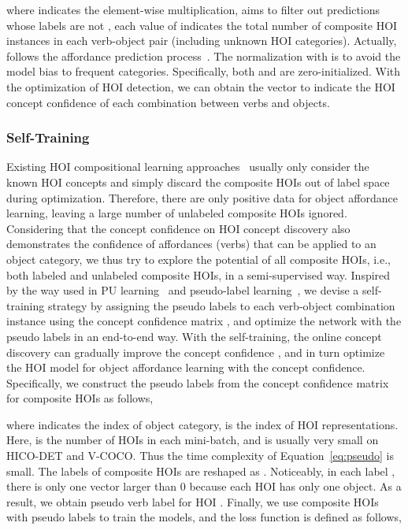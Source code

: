 \documentclass[runningheads]{llncs}
\begin{document}
where  indicates the element-wise multiplication,  aims to filter out predictions whose labels are not , each value of  indicates the total number of composite HOI instances in each verb-object pair (including unknown HOI categories). Actually,  follows the affordance prediction process~\cite{hou2021atl}. The normalization with  is to avoid the model bias to frequent categories. Specifically, both  and  are zero-initialized. With the optimization of HOI detection, we can obtain the vector  to indicate the HOI concept confidence of each combination between verbs and objects.

















\subsubsection{Self-Training}

Existing HOI compositional learning approaches~\cite{hou2020visual,hou2021fcl,hou2021atl} usually only consider the known HOI concepts and simply discard the composite HOIs out of label space during optimization. Therefore, there are only positive data for object affordance learning, leaving a large number of unlabeled composite HOIs ignored. Considering that the concept confidence on HOI concept discovery also demonstrates the confidence of affordances (verbs) that can be applied to an object category, we thus try to explore the potential of all composite HOIs, i.e., both labeled and unlabeled composite HOIs,  in a semi-supervised way. Inspired by the way used in PU learning~\cite{de1999positive} and pseudo-label learning~\cite{lee2013pseudo}, we devise a self-training strategy by assigning the pseudo labels to each verb-object combination instance using the concept confidence matrix , and optimize the network with the pseudo labels in an end-to-end way. With the self-training, the online concept discovery can gradually improve the concept confidence , and in turn optimize the HOI model for object affordance learning with the concept confidence.
Specifically, we construct the pseudo labels  from the concept confidence matrix  for composite HOIs  as follows,





where  indicates the index of object category,  is the index of HOI representations. Here,  is the number of HOIs in each mini-batch, and is usually very small on HICO-DET and V-COCO. Thus the time complexity of Equation~\ref{eq:pseudo} is small. The labels of composite HOIs are reshaped as . Noticeably, in each label , there is only one vector  larger than 0 because each HOI has only one object. As a result, we obtain pseudo verb label  for HOI . Finally, we use composite HOIs with pseudo labels to train the models, and the loss function is defined as follows,
\end{document}
